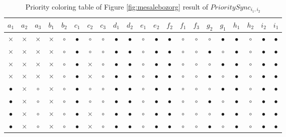 \begin{BehExample}
\begin{table}
{\setlength\tabcolsep{3.25pt}
\noindent
\begin{tabular}{|c|c|c|c|c|c|c|c|c|c|c|c|c|c|c|c|c|c|c|c|c|}
  \hline
$a_1$ & $a_2$ & $a_3$ & $b_1$ & $b_2$ & $c_1$ & $c_2$ & $c_3$ & $d_1$ & $d_2$ & $e_1$ & $e_2$ & $f_2$ & $f_1$ & $f_3$ & $g_2$ & $g_1$ & $h_1$ & $h_2$ & $i_2$ & $i_1$ \\ 
\hline
$\times$ & $\times$ & $\times$ & $\times$ & $\circ$ & $\bullet$ & $\circ$ & $\circ$ & $\bullet$ & $\bullet$ & $\circ$ & $\bullet$ & $\bullet$ & $\circ$ & $\circ$ & $\circ$ & $\bullet$ & $\bullet$ & $\circ$ & $\bullet$ & $\bullet$ \\ 
\hline
$\times$ & $\times$ & $\times$ & $\times$ & $\circ$ & $\bullet$ & $\circ$ & $\circ$ & $\bullet$ & $\bullet$ & $\circ$ & $\bullet$ & $\bullet$ & $\circ$ & $\circ$ & $\bullet$ & $\circ$ & $\bullet$ & $\circ$ & $\bullet$ & $\bullet$ \\ 
\hline
$\times$ & $\times$ & $\times$ & $\times$ & $\circ$ & $\bullet$ & $\times$ & $\circ$ & $\bullet$ & $\bullet$ & $\circ$ & $\bullet$ & $\bullet$ & $\circ$ & $\circ$ & $\circ$ & $\bullet$ & $\bullet$ & $\circ$ & $\bullet$ & $\bullet$ \\ 
\hline
$\times$ & $\times$ & $\times$ & $\times$ & $\circ$ & $\bullet$ & $\times$ & $\circ$ & $\bullet$ & $\bullet$ & $\circ$ & $\bullet$ & $\bullet$ & $\circ$ & $\circ$ & $\bullet$ & $\circ$ & $\bullet$ & $\circ$ & $\bullet$ & $\bullet$ \\ 
\hline
$\bullet$ & $\times$ & $\circ$ & $\times$ & $\circ$ & $\bullet$ & $\circ$ & $\circ$ & $\bullet$ & $\bullet$ & $\circ$ & $\bullet$ & $\bullet$ & $\circ$ & $\circ$ & $\circ$ & $\bullet$ & $\bullet$ & $\circ$ & $\bullet$ & $\bullet$ \\ 
\hline
$\bullet$ & $\times$ & $\circ$ & $\times$ & $\circ$ & $\bullet$ & $\circ$ & $\circ$ & $\bullet$ & $\bullet$ & $\circ$ & $\bullet$ & $\bullet$ & $\circ$ & $\circ$ & $\bullet$ & $\circ$ & $\bullet$ & $\circ$ & $\bullet$ & $\bullet$ \\ 
\hline
$\bullet$ & $\times$ & $\circ$ & $\times$ & $\circ$ & $\bullet$ & $\times$ & $\circ$ & $\bullet$ & $\bullet$ & $\circ$ & $\bullet$ & $\bullet$ & $\circ$ & $\circ$ & $\circ$ & $\bullet$ & $\bullet$ & $\circ$ & $\bullet$ & $\bullet$ \\ 
\hline
$\bullet$ & $\times$ & $\circ$ & $\times$ & $\circ$ & $\bullet$ & $\times$ & $\circ$ & $\bullet$ & $\bullet$ & $\circ$ & $\bullet$ & $\bullet$ & $\circ$ & $\circ$ & $\bullet$ & $\circ$ & $\bullet$ & $\circ$ & $\bullet$ & $\bullet$ \\ 
\hline
\end{tabular}
}
\caption{Priority coloring table of Figure \ref{fig:mesalebozorg} result of $PrioritySync_{i_1, i_2}$}
\label{tab:j11}
\end{table}


\end{BehExample}

